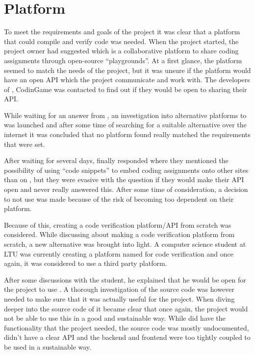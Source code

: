 \section{Platform}   
To meet the requirements and goals of the project it was clear that a platform that could compile and verify code was needed.
When the project started, the project owner had suggested \techio{} which is a collaborative platform to share coding assignments through open-source ``playgrounds''. At a first glance, the platform seemed to match the needs of the project, but it was unsure if the platform would have an open API which the project communicate and work with. The developers of \techio{}, CodinGame was contacted to find out if they would be open to sharing their API.


While waiting for an answer from \techio{}, an investigation into alternative platforms to \techio{} was launched and after some time of searching for a suitable alternative over the internet it was concluded that no platform found really matched the requirements that were set.

After waiting for several days, \techio{} finally responded where they mentioned the possibility of using ``code snippets'' to embed coding assignments onto other sites than on \techio{}, but they were evasive with the question if they would make their API open and never really answered this. After some time of consideration, a decision to not use \techio{} was made because of the risk of becoming too dependent on their platform.

Because of this, creating a code verification platform/API from scratch was considered. While discussing about making a code verification platform from scratch, a new alternative was brought into light. A computer science student at LTU was currently creating a platform named \sockr{} for code verification and once again, it was considered to use a third party platform.

After some discussions with the student, he explained that he would be open for the project to use \sockr{}. A thorough investigation of the \sockr{} source code was however needed to make sure that it was actually useful for the project. When diving deeper into the source code of \sockr{} it became clear that once again, the project would not be able to use this in a good and sustainable way. While \sockr{} did have the functionality that the project needed, the source code was mostly undocumented, didn't have a clear API and the backend and frontend were too tightly coupled to be used in a sustainable way.

